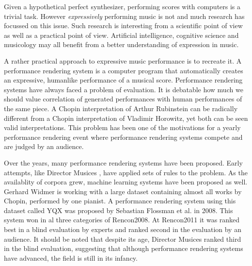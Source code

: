 \documentclass[a4paper,10pt]{article}
\begin{document}
Given a hypothetical perfect synthesizer, performing scores with computers is a trivial task. However \textit{expressively} performing music is not and much research has focussed on this issue. Such research is interesting from a scientific point of view as well as a practical point of view. Artificial intelligence, cognitive science and musicology may all benefit from a better understanding of expression in music. 


A rather practical approach to expressive music performance is to recreate it. A performance rendering system is a computer program that automatically creates an expressive, humanlike performance of a musical score. Performance rendering systems have always faced a problem of evaluation. It is debatable how much we should value correlation of generated performances with human performances of the same piece. A Chopin interpretation of Arthur Rubinstein can be radically different from a Chopin interpretation of Vladimir Horowitz, yet both can be seen valid interpretations. This problem has been one of the motivations for a yearly performance rendering event where performance rendering systems compete and are judged by an audience. 

Over the years, many performance rendering systems have been proposed. Early attempts, like Director Musices \cite{friberg2000generating}, have applied sets of rules to the problem. As the availablity of corpora grew, machine learning systems have been proposed as well. Gerhard Widmer is working with a large dataset containing almost all works by Chopin, performed by one pianist. A performance rendering system using this dataset called YQX \cite{yqx} was proposed by Sebastian Flossman et al. in 2008. This system won in al three categories of Rencon2008. At Rencon2011 it was ranked best in a blind evaluation by experts and ranked second in the evaluation by an audience. It should be noted that despite its age, Director Musices ranked third in the blind evaluation, suggesting that although performance rendering systems have advanced, the field is still in its infancy.
\end{document}
